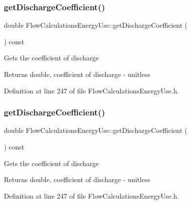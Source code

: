 \subsubsection{\texorpdfstring{get\+Discharge\+Coefficient()}{getDischargeCoefficient()}\hspace{0.1cm}{\footnotesize\ttfamily [2/3]}}
{\footnotesize\ttfamily double Flow\+Calculations\+Energy\+Use\+::get\+Discharge\+Coefficient (\begin{DoxyParamCaption}{ }\end{DoxyParamCaption}) const\hspace{0.3cm}{\ttfamily [inline]}}

Gets the coefficient of discharge

\begin{DoxyReturn}{Returns}
double, coefficient of discharge -\/ unitless 
\end{DoxyReturn}


Definition at line 247 of file Flow\+Calculations\+Energy\+Use.\+h.

\mbox{\label{class_flow_calculations_energy_use_a28033765df3a220b5c7d75e34fd95c43}} 
\subsubsection{\texorpdfstring{get\+Discharge\+Coefficient()}{getDischargeCoefficient()}\hspace{0.1cm}{\footnotesize\ttfamily [3/3]}}
{\footnotesize\ttfamily double Flow\+Calculations\+Energy\+Use\+::get\+Discharge\+Coefficient (\begin{DoxyParamCaption}{ }\end{DoxyParamCaption}) const\hspace{0.3cm}{\ttfamily [inline]}}

Gets the coefficient of discharge

\begin{DoxyReturn}{Returns}
double, coefficient of discharge -\/ unitless 
\end{DoxyReturn}


Definition at line 247 of file Flow\+Calculations\+Energy\+Use.\+h.

\mbox{\label{class_flow_calculations_energy_use_a6b892e984bd09e821cb642f8f8efd221}} 
